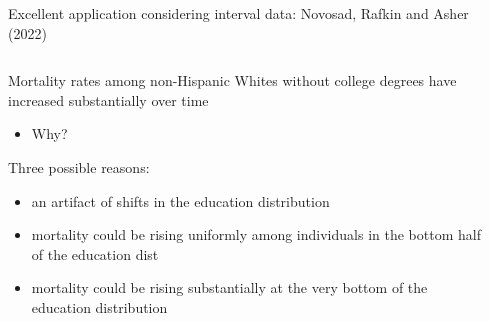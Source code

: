 \documentclass[notes,11pt, aspectratio=169]{beamer}
\newenvironment{wideitemize}{\itemize\addtolength{\itemsep}{10pt}}{\enditemize}
\begin{document}
\begin{frame}{Excellent application considering interval data: Novosad, Rafkin and Asher (2022)}
      \begin{columns}[onlytextwidth, T] %
        \begin{column}{.5\textwidth}
          \begin{wideitemize}
          \item Mortality rates among non-Hispanic Whites without college degrees have
            increased substantially over time
            \begin{itemize}
            \item Why?
            \end{itemize}
          \item Three possible reasons:
            \begin{itemize}
            \item an artifact of shifts in the education
              distribution
            \item mortality could be rising uniformly among
              individuals in the bottom half of the education dist
            \item mortality could be rising substantially at the very
              bottom of the education distribution
            \end{itemize}
          \end{wideitemize}
      \end{column}%
      \hfill%
      \begin{column}{.5\textwidth}

\end{column}
\end{columns}
\end{frame}
\end{document}
